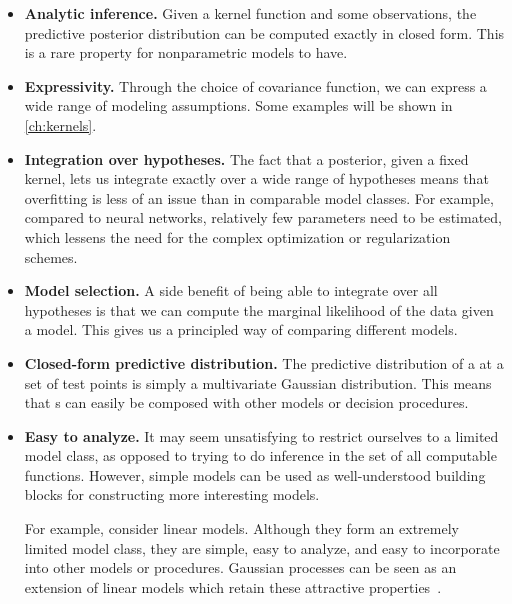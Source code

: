 \begin{itemize}

\item {\bf Analytic inference.}
Given a kernel function and some observations, the predictive posterior distribution can be computed exactly in closed form.
This is a rare property for nonparametric models to have.

\item {\bf Expressivity.}
Through the choice of covariance function, we can express a wide range of modeling assumptions.
Some examples will be shown in \cref{ch:kernels}.

\item {\bf Integration over hypotheses.}
The fact that a \gp{} posterior, given a fixed kernel, lets us integrate exactly over a wide range of hypotheses means that overfitting is less of an issue than in comparable model classes.
For example, compared to neural networks, relatively few parameters need to be estimated, which lessens the need for the complex optimization or regularization schemes.
%

\item {\bf Model selection.}
A side benefit of being able to integrate over all hypotheses is that we can compute the marginal likelihood of the data given a model.
This gives us a principled way of comparing different models.

\item {\bf Closed-form predictive distribution.}
The predictive distribution of a \gp{} at a set of test points is simply a multivariate Gaussian distribution.
This means that \gp{}s can easily be composed with other models or decision procedures.

\item {\bf Easy to analyze.}
It may seem unsatisfying to restrict ourselves to a limited model class, as opposed to trying to do inference in the set of all computable functions.
However, simple models can be used as well-understood building blocks for constructing more interesting models. %

For example, consider linear models.
Although they form an extremely limited model class, they are simple, easy to analyze, and easy to incorporate into other models or procedures.
Gaussian processes can be seen as an extension of linear models which retain these attractive properties~\citep[chapter 2]{rasmussen38gaussian}.


\end{itemize}




